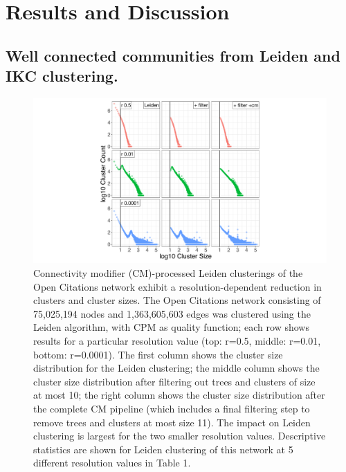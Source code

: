 \documentclass[a4paper]{article}   	%
\begin{document}
\section{Results and Discussion}

\subsection{Well connected communities from Leiden and IKC clustering.}

\begin{figure}[H]
\centering
\includegraphics[width=0.8\linewidth]{figs/fig1_kn.pdf}
\caption{Connectivity modifier (CM)-processed Leiden clusterings of the Open Citations network exhibit a resolution-dependent reduction in clusters and cluster sizes. 
The Open Citations network consisting of 75,025,194 nodes and 1,363,605,603 edges was clustered using the Leiden algorithm, with CPM as quality function; each row shows results for a particular resolution value (top: r=0.5, middle: r=0.01, bottom: r=0.0001).  
The first column shows the cluster size distribution for the Leiden clustering; the middle column shows the cluster size distribution after filtering out trees and clusters of size at most 10; the right column shows the cluster size distribution after the complete CM pipeline (which includes a final filtering step to remove trees and clusters at most size 11). 
The impact on Leiden clustering is largest for the two smaller resolution values. 
Descriptive statistics are shown for Leiden clustering of this network at 5 different resolution values in Table 1.}
\label{fig:oc_size_count_plots}
\end{figure}
\end{document}

